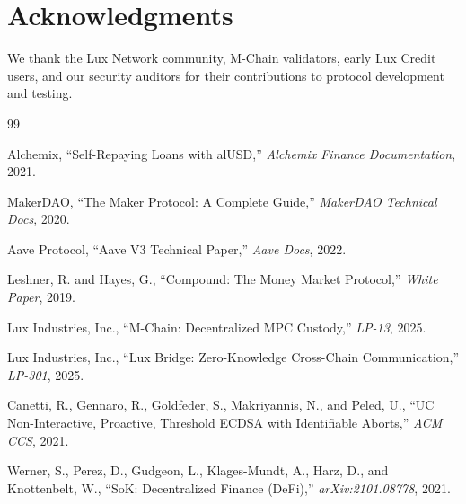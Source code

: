\section*{Acknowledgments}


We thank the Lux Network community, M-Chain validators, early Lux Credit users, and our security auditors for their contributions to protocol development and testing.


\begin{thebibliography}{99}

Alchemix, ``Self-Repaying Loans with alUSD,'' \textit{Alchemix Finance Documentation}, 2021.

MakerDAO, ``The Maker Protocol: A Complete Guide,'' \textit{MakerDAO Technical Docs}, 2020.

Aave Protocol, ``Aave V3 Technical Paper,'' \textit{Aave Docs}, 2022.

Leshner, R. and Hayes, G., ``Compound: The Money Market Protocol,'' \textit{White Paper}, 2019.

Lux Industries, Inc., ``M-Chain: Decentralized MPC Custody,'' \textit{LP-13}, 2025.

Lux Industries, Inc., ``Lux Bridge: Zero-Knowledge Cross-Chain Communication,'' \textit{LP-301}, 2025.

Canetti, R., Gennaro, R., Goldfeder, S., Makriyannis, N., and Peled, U., ``UC Non-Interactive, Proactive, Threshold ECDSA with Identifiable Aborts,'' \textit{ACM CCS}, 2021.

Werner, S., Perez, D., Gudgeon, L., Klages-Mundt, A., Harz, D., and Knottenbelt, W., ``SoK: Decentralized Finance (DeFi),'' \textit{arXiv:2101.08778}, 2021.

\end{thebibliography}

